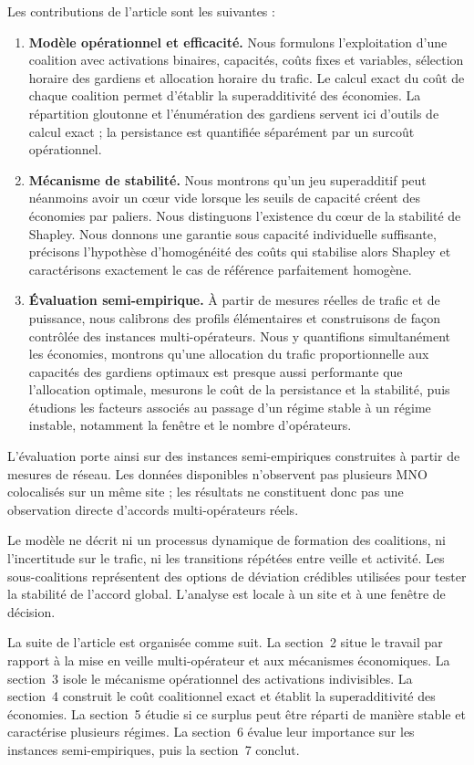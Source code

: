 Les contributions de l'article sont les suivantes :
\begin{enumerate}
    \item \textbf{Modèle opérationnel et efficacité.} Nous formulons
    l'exploitation d'une coalition avec activations binaires, capacités,
    coûts fixes et variables, sélection horaire des gardiens et allocation
    horaire du trafic. Le calcul exact du coût de chaque coalition permet
    d'établir la superadditivité des économies. La répartition gloutonne et
    l'énumération des gardiens servent ici d'outils de calcul exact ; la
    persistance est quantifiée séparément par un surcoût opérationnel.
    \item \textbf{Mécanisme de stabilité.} Nous montrons qu'un jeu
    superadditif peut néanmoins avoir un cœur vide lorsque les seuils de
    capacité créent des économies par paliers. Nous distinguons l'existence
    du cœur de la stabilité de Shapley. Nous donnons une garantie sous capacité
    individuelle suffisante, précisons l'hypothèse d'homogénéité des coûts qui
    stabilise alors Shapley et caractérisons exactement le cas de référence
    parfaitement homogène.
    \item \textbf{Évaluation semi-empirique.} À partir de mesures réelles de
    trafic et de puissance, nous calibrons des profils élémentaires et
    construisons de façon contrôlée des instances multi-opérateurs. Nous y
    quantifions simultanément les économies, montrons qu'une allocation du
    trafic proportionnelle aux capacités des gardiens optimaux est presque
    aussi performante que l'allocation optimale, mesurons le coût de la
    persistance et la
    stabilité, puis étudions les facteurs associés au passage d'un régime
    stable à un régime instable, notamment la fenêtre et le nombre
    d'opérateurs.
\end{enumerate}

L'évaluation porte ainsi sur des instances semi-empiriques construites à
partir de mesures de réseau. Les données disponibles n'observent pas plusieurs
MNO colocalisés sur un même site ; les résultats ne constituent donc pas une
observation directe d'accords multi-opérateurs réels.

Le modèle ne décrit ni un processus dynamique de formation des coalitions, ni
l'incertitude sur le trafic, ni les transitions répétées entre veille et
activité. Les sous-coalitions représentent des options de déviation crédibles
utilisées pour tester la stabilité de l'accord global. L'analyse est locale à
un site et à une fenêtre de décision.

La suite de l'article est organisée comme suit. La section~2 situe le travail
par rapport à la mise en veille multi-opérateur et aux mécanismes
économiques. La section~3 isole le mécanisme opérationnel des activations
indivisibles. La section~4 construit le coût coalitionnel exact et établit la
superadditivité des économies. La section~5 étudie si ce surplus peut être
réparti de manière stable et caractérise plusieurs régimes. La section~6
évalue leur importance sur les instances semi-empiriques, puis la section~7
conclut.
